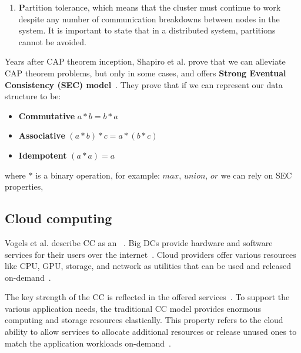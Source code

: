 \begin{enumerate} [start=1,label={(\bfseries \arabic*)}]
	\noindent
	We can calculate availability class if we have system availability $A$, the system's availability class is defined as~\cite{GrayS91}: 
	
	\begin{equation} 
	e^{\log_{10} \frac{1}{ (1 - A)}} 
	\end{equation}
	It is important to notice that even a 99\% available system gives almost four days of downtime in a year, which is unacceptable for services like Facebook, Google, AWS, etc. And when the service is down, companies are losing customers.
	\item \textbf{P}artition tolerance, which means that the cluster must continue to work despite any number of communication breakdowns between nodes in the system. It is important to state that in a distributed system, partitions cannot be avoided.
\end{enumerate}

\noindent
Years after CAP theorem inception, Shapiro et al. prove that we can alleviate CAP theorem problems, but only in some cases, and offers \textbf{Strong Eventual Consistency (SEC) model}~\cite{ShapiroPBZ11}. They prove that if we can represent our data structure to be: \label{crdts}

\begin{itemize}
	\item \textbf{Commutative} $a*b = b*a$ 
	\item \textbf{Associative} $(a*b)*c = a*(b*c)$ 
	\item \textbf{Idempotent} $(a * a) = a$ 
\end{itemize}

\noindent
where $*$ is a binary operation, for example: $max$, $union$, $or$ we can rely on SEC properties,
%
%
\subsection{Cloud computing}\label{sec:cloud_computing}
%
Vogels et al. describe CC as an ~\cite{Vogels}.  Big DCs provide hardware and software services for their users over the internet~\cite{AboveTheCloud}. Cloud providers offer various resources like CPU, GPU, storage, and network as utilities that can be used and released on-demand~\cite{ZhangCB10}. 

The key strength of the CC is reflected in the offered services~\cite{Vogels}. To support the various application needs, the traditional CC model provides enormous computing and storage resources elastically. This property refers to the cloud ability to allow services to allocate additional resources or release unused ones to match the application workloads on-demand~\cite{AssuncaoVB18}. 

